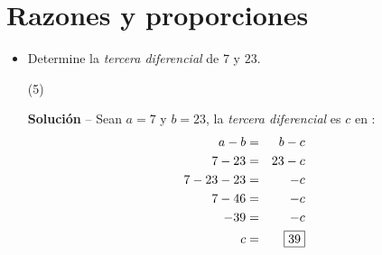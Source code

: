 \documentclass[10pt, twocolumn, landscape, a4paper]{article}
\begin{document}
\section*{Razones y proporciones}
\begin{itemize}
	\item{Determine la \textit{tercera diferencial} de $7$ y $23$.
		\begin{tasks}(5)
		\end{tasks}
		\noindent \textbf{Solución} -- {\small Sean $a = 7$ y $b = 23$, la \textit{tercera diferencial} es $c$ en} :
		\begin{eqnarray*}
			a - b &=& b - c \\
			7 - 23 &=& 23 - c \\
			7 - 23 - 23 &=& - c \\
			7 - 46 &=& - c \\
			- 39 &=& - c \\
			c &=& \fbox{39}
		\end{eqnarray*}
	}
	
	
	
\end{itemize}
\end{document}
